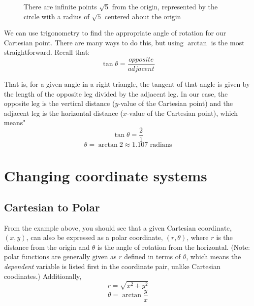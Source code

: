 \begin{figure}[htbp]
\centering
    \label{fig:circle}
    \caption{There are infinite points $\sqrt{5}$ from the origin, represented 
    by the circle with a radius of $\sqrt{5}$ centered about the origin}
    \end{figure}

We can use trigonometry to find the appropriate angle of rotation for our 
Cartesian point. There are many ways to do this, but using $\arctan$ is the 
most straightforward. Recall that:
$$\tan{\theta} = \frac{opposite}{adjacent}$$

That is, for a given angle in a right triangle, the tangent of that angle is 
given by the length of the opposite leg divided by the adjacent leg. In our 
case, the opposite leg is the vertical distance ($y$-value of the Cartesian 
point) and the adjacent leg is the horizontal distance ($x$-value of the 
Cartesian point), which means"
$$\tan{\theta} = \frac{2}{1}$$
$$\theta = \arctan{2} \approx 1.107\text{ radians}$$

\section{Changing coordinate systems}

\subsection{Cartesian to Polar}
From the example above, you should see that a given Cartesian coordinate, 
$(x,y)$, can also be expressed as a polar coordinate, $(r, \theta)$, where $r$ 
is the distance from the origin and $\theta$ is the angle of rotation from the 
horizontal. (Note: polar functions are generally given as $r$ defined in terms 
of $\theta$, which means the \textit{dependent} variable is listed first in 
the coordinate pair, unlike Cartesian coodinates.) Additionally, 
$$r = \sqrt{x^2 + y^2}$$
$$\theta = \arctan{\frac{y}{x}}$$

